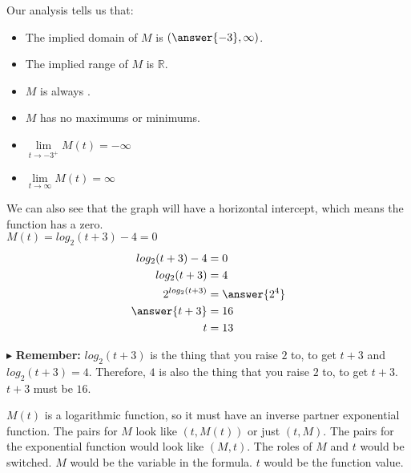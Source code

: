 \documentclass{ximera}
\begin{document}
\begin{example}
\begin{explanation}
Our analysis tells us that:

\begin{itemize}
\item The implied domain of $M$ is $\left( \answer{-3} ,\infty \right)$.
\item The implied range of $M$ is $\mathbb{R}$.
\item $M$ is always  .
\item $M$ has no maximums or minimums.
\item $\lim\limits_{t \to -3^+} M(t) = -\infty$
\item $\lim\limits_{t \to \infty} M(t) = \infty$
\end{itemize}




We can also see that the graph will have a horizontal intercept, which means the function has a zero. \\


$M(t) = log_2(t+3) - 4 = 0$ \\


\begin{align*}
log_2(t+3) - 4 & = 0 \\
log_2(t+3) & = 4 \\
2^{log_2(t+3)} & = \answer{2^4} \\
\answer{t+3} & = 16 \\
t & = 13
\end{align*}


$\blacktriangleright$ \textbf{Remember:} $log_2(t+3)$ is the thing that you raise $2$ to, to get $t+3$ and $log_2(t+3) = 4$.  Therefore, $4$ is also the thing that you raise $2$ to, to get $t+3$. $t+3$ must be $16$.









\end{explanation}

\end{example}



$M(t)$ is a logarithmic function, so it must have an inverse partner exponential function.  The pairs for $M$ look like $(t, M(t))$ or just $(t,M)$. The pairs for the exponential function would look like $(M, t)$.  The roles of $M$ and $t$ would be switched. $M$ would be the variable in the formula. $t$ would be the function value.\\
\end{document}
